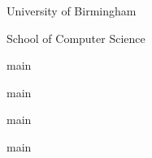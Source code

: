 \begin{titlepage}
\begin{center}
        \vspace*{2em}
        \textbf{\LARGE \@author}

        \vspace*{2em}
        {\LARGE
            \setlength{\parskip}{0.5em}
            University of Birmingham

            School of Computer Science

            \@date\par
        }

        \vspace*{\fill}
    \end{center}
\end{titlepage}
\makeatother



\tableofcontents
\newpage

{main}

{main}

{main}

{main}

{\raggedright\printbibliography}


